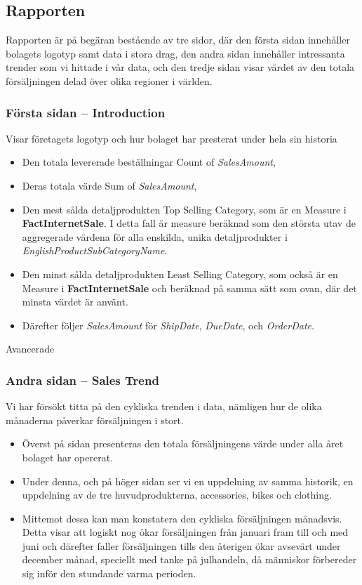 \documentclass[10pt]{article}
\begin{document}
\subsection{Rapporten}

Rapporten är på begäran bestående av tre sidor, där den första sidan innehåller bolagets logotyp samt data i stora drag, den andra sidan innehåller intressanta trender som vi hittade i vår data, och den tredje sidan visar värdet av den totala försäljningen delad över olika regioner i världen.

\subsubsection{Första sidan -- Introduction}

Visar företagets logotyp och hur bolaget har presterat under hela sin historia

\begin{itemize}
	\item Den totala levererade beställningar Count of \emph{SalesAmount},
	\item Deras totala värde Sum of \emph{SalesAmount},
	\item Den mest sålda detaljprodukten Top Selling Category, som är en Measure i \textbf{FactInternetSale}. I detta fall är measure beräknad som den största utav de aggregerade värdena för alla enskilda, unika detaljprodukter i \emph{EnglishProductSubCategoryName}.
	\item Den minst sålda detaljprodukten Least Selling Category, som också är en Measure i \textbf{FactInternetSale} och beräknad på samma sätt som ovan, där det minsta värdet är använt.
	\item Därefter följer \emph{SalesAmount} för \emph{ShipDate}, \emph{DueDate}, och \emph{OrderDate}.
\end{itemize}

Avancerade 

\subsubsection{Andra sidan -- Sales Trend}

Vi har försökt titta på den cykliska trenden i data, nämligen hur de olika månaderna påverkar försäljningen i stort.

\begin{itemize}
	\item Överst på sidan presenteras den totala försäljningens värde under alla året bolaget har opererat.
	\item Under denna, och på höger sidan ser vi en uppdelning av samma historik, en uppdelning av de tre huvudprodukterna, accessories, bikes och clothing.
	\item Mittemot dessa kan man konstatera den cykliska försäljningen månadsvis. Detta visar att logiskt nog ökar försäljningen från januari fram till och med juni och därefter faller försäljningen tills den återigen ökar avsevärt under december månad, speciellt med tanke på julhandeln, då människor förbereder sig inför den stundande varma perioden.
\end{itemize}
\end{document}
